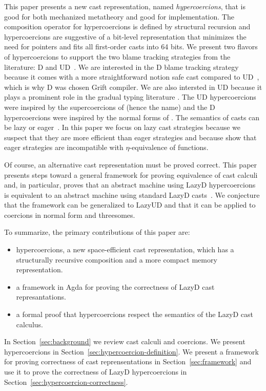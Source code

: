 \documentclass[acmsmall,review,anonymous]{acmart}\settopmatter{printfolios=true,printccs=false,printacmref=false}
\newcommand{\lazyUD}{Lazy\;UD}
\newcommand{\lazyD}{Lazy\;D}
\begin{document}
This paper presents a new cast representation, named
\emph{hypercoercions}, that is good for both mechanized metatheory and
good for implementation. The composition operator for hypercoercions
is defined by structural recursion and hypercoercions are suggestive
of a bit-level representation that minimizes the need for pointers and
fits all first-order casts into 64 bits.
%
We present two flavors of hypercoercions to support the two blame
tracking strategies from the literature: D and
UD~\citep{siek2009exploring}. We are interested in the D blame
tracking strategy because it comes with a more straightforward notion
safe cast compared to UD~\citep{siek2009exploring}, which is why D was
chosen Grift compiler. We are also intersted in UD because it plays a
prominent role in the gradual typing literature
\citep{wadler2009well}.  The UD hypercoercions were inspired by the
supercoercions of \citet{garcia2013calculating} (hence the name) and
the D hypercoercions were inspired by the normal forms of
\citet{siek2012interpretations}.
%
The semantics of casts can be lazy or
eager~\citep{siek2009exploring}. In this paper we focus on lazy cast
strategies because we suspect that they are more efficient than eager
strategies and because \citet{new2019gradual} show that eager
strategies are incompatible with $\eta$-equivalence of functions.

Of course, an alternative cast representation must be proved
correct. This paper presents steps toward a general framework for
proving equivalence of cast calculi and, in particular, proves that an
abstract machine using \lazyD{} hypercoercions is equivalent to an
abstract machine using standard \lazyD{}
casts~\citep{siek2009exploring}. We conjecture that the framework can
be generalized to \lazyUD{} and that it can be applied to coercions in
normal form and threesomes.

To summarize, the primary contributions of this paper are:
\begin{itemize}
\item hypercoercions, a new space-efficient cast representation, which
  has a structurally recursive composition and a more compact memory
  representation.
\item a framework in Agda for proving the correctness of \lazyD{} cast
  represantations.
\item a formal proof that hypercoercions respect the semantics
  of the \lazyD{} cast calculus.
\end{itemize}

In Section~\ref{sec:background} we review cast calculi and coercions.
We present hypercoercions in
Section~\ref{sec:hypercoercion-definition}.  We present a framework
for proving correctness of cast reprensentations in
Section~\ref{sec:framework} and use it to prove the correctness of
\lazyD{} hypercoercions in
Section~\ref{sec:hypercoercion-correctness}.
\end{document}
